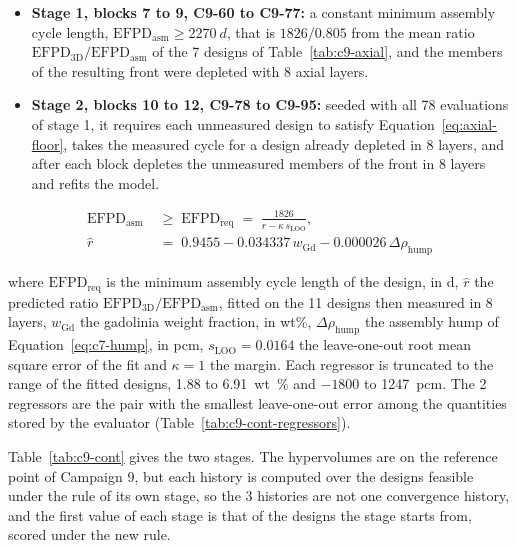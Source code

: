 \begin{itemize}
  \item \textbf{Stage 1, blocks 7 to 9, C9-60 to C9-77:} a constant
        minimum assembly cycle length,
        $\mathrm{EFPD}_\mathrm{asm} \ge \SI{2270}{d}$, that is
        $1826/0.805$ from the mean ratio
        $\mathrm{EFPD}_\mathrm{3D}/\mathrm{EFPD}_\mathrm{asm}$ of the 7
        designs of Table~\ref{tab:c9-axial}, and the members of the
        resulting front were depleted with 8 axial layers.
  \item \textbf{Stage 2, blocks 10 to 12, C9-78 to C9-95:} seeded with
        all 78 evaluations of stage 1, it requires each unmeasured
        design to satisfy Equation~\eqref{eq:axial-floor}, takes the
        measured cycle for a design already depleted in 8 layers, and
        after each block depletes the unmeasured members of the front
        in 8 layers and refits the model.
\end{itemize}

\begin{equation}
\begin{split}
\mathrm{EFPD}_\mathrm{asm} &\;\ge\; \mathrm{EFPD}_\mathrm{req} \;=\;
\frac{1826}{\hat{r} - \kappa\, s_\mathrm{LOO}},\\
\hat{r} &\;=\; 0.9455 - 0.034337\, w_\mathrm{Gd} - 0.000026\, \Delta\rho_\mathrm{hump}
\end{split}
\label{eq:axial-floor}
\end{equation}

\noindent where $\mathrm{EFPD}_\mathrm{req}$ is the minimum assembly cycle length
of the design, in d, $\hat{r}$ the predicted ratio
$\mathrm{EFPD}_\mathrm{3D}/\mathrm{EFPD}_\mathrm{asm}$, fitted on the 11 designs then
measured in 8 layers, $w_\mathrm{Gd}$ the gadolinia weight fraction,
in wt\%, $\Delta\rho_\mathrm{hump}$ the assembly hump of
Equation~\eqref{eq:c7-hump}, in pcm, $s_\mathrm{LOO} = 0.0164$ the
leave-one-out root mean square error of the fit and $\kappa = 1$ the
margin. Each regressor is truncated to the range of the fitted designs,
1.88 to \SI{6.91}{wt\%} and $-1800$ to \SI{+1247}{pcm}. The 2
regressors are the pair with the smallest leave-one-out error among the
quantities stored by the evaluator (Table~\ref{tab:c9-cont-regressors}).

Table~\ref{tab:c9-cont} gives the two stages. The hypervolumes are on
the reference point of Campaign 9, but each history is computed over
the designs feasible under the rule of its own stage, so the 3
histories are not one convergence history, and the first value of each
stage is that of the designs the stage starts from, scored under the
new rule.


